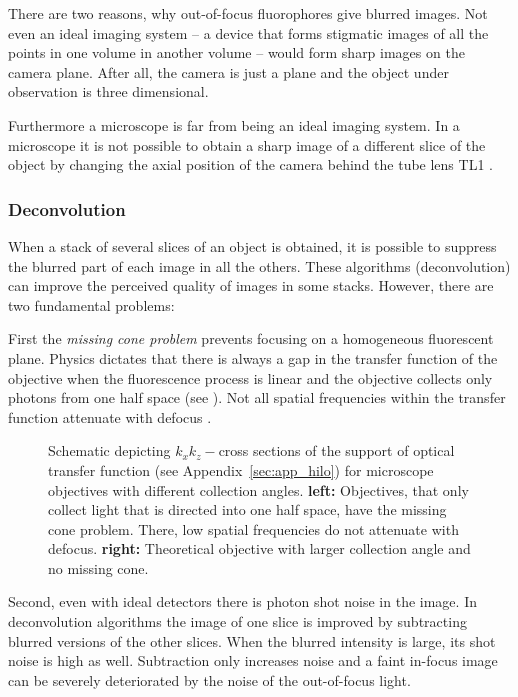 There are two reasons, why out-of-focus fluorophores give blurred
images. Not even an ideal imaging system -- a device that forms
stigmatic images of all the points in one volume in another volume --
would form sharp images on the camera plane. After all, the camera is
just a plane and the object under observation is three dimensional.

Furthermore a microscope is far from being an ideal imaging system. In
a microscope it is not possible to obtain a sharp image of a different
slice of the object by changing the axial position of the camera
behind the tube lens TL1 \citep{Botcherby2007,Botcherby2008a}.
\subsubsection*{Deconvolution}
When a stack of several slices of an object is obtained, it is
possible to suppress the blurred part of each image in all the
others. These algorithms (deconvolution) can improve the perceived
quality of images in some stacks. However, there are two fundamental
problems:

First the \emph{missing cone problem} prevents focusing on a
homogeneous fluorescent plane. Physics dictates that there is always a
gap in the transfer function of the objective when the fluorescence
process is linear and the objective collects only photons from one
half space (see ). Not all spatial
frequencies within the transfer function attenuate with defocus
\citep{Neil1997}.

\begin{figure}[!hbt]
  \centering
  \caption{Schematic depicting $k_xk_z-$cross sections of the support
    of optical transfer function (see Appendix~\ref{sec:app_hilo}) for
    microscope objectives with different collection angles. {\bf
      left:} Objectives, that only collect light that is directed into
    one half space, have the missing cone problem. There, low spatial
    frequencies do not attenuate with defocus. {\bf right:} Theoretical
    objective with larger collection angle and no missing cone.}
  \label{fig:missing-cone}
\end{figure}

Second, even with ideal detectors there is photon shot noise in the
image. In deconvolution algorithms the image of one slice is improved
by subtracting blurred versions of the other slices. When the blurred
intensity is large, its shot noise is high as well. Subtraction only
increases noise and a faint in-focus image can be severely
deteriorated by the noise of the out-of-focus light.
